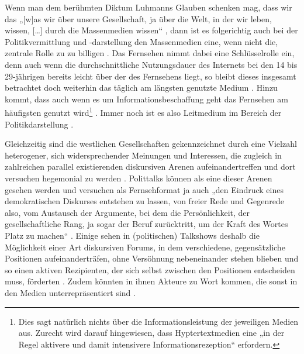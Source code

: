 Wenn man dem berühmten Diktum Luhmanns Glauben schenken mag, dass wir das „[w]as wir über unsere Gesellschaft, ja über die Welt, in der wir leben, wissen, [\ldots] durch die Massenmedien wissen“ \parencite[9]{luhmannRealitaetMassenmedien2017}, dann ist es folgerichtig auch bei der Politikvermittlung und -darstellung den Massenmedien eine, wenn nicht die, zentrale Rolle zu zu billigen \parencite[37-45]{doernerPolitainmentPolitikMedialen2001}. Das Fernsehen nimmt dabei eine Schlüsselrolle ein, denn auch wenn die durchschnittliche Nutzungsdauer des Internets bei den 14 bis 29-jährigen bereits leicht über der des Fernsehens liegt, so bleibt dieses insgesamt betrachtet doch weiterhin das täglich am längsten genutzte Medium \parencite{ard/zdf-medienkommissionARDZDFOnlinestudie2012}. Hinzu kommt, dass auch wenn es um Informationsbeschaffung geht das Fernsehen am häufigsten genutzt wird\footnote{Dies sagt natürlich nichts über die Informationsleistung der jeweiligen Medien aus. Zurecht wird darauf hingewiesen, dass Hyptertextmedien eine „in der Regel aktivere und damit intensivere Informationsrezeption“ \parencite[17]{mendeMedienuebergreifendeInformationsnutzungUnd2012} erfordern.} \parencite[16]{mendeMedienuebergreifendeInformationsnutzungUnd2012}. Immer noch ist es also Leitmedium im Bereich der Politikdarstellung \parencite[275]{bucherMedienrealitaetPolitischenZur2004}.

Gleichzeitig sind die westlichen Gesellschaften gekennzeichnet durch eine Vielzahl heterogener, sich widersprechender Meinungen und Interessen, die zugleich in zahlreichen parallel existierenden diskursiven Arenen aufeinandertreffen und dort versuchen hegemonial zu werden \parencite[306]{nonhoffHegemonieanalyseTheorieMethode2010}. Polittalks können als eine dieser Arenen gesehen werden und versuchen als Fernsehformat ja auch „den Eindruck eines demokratischen Diskurses entstehen zu lassen, von freier Rede und Gegenrede also, vom Austausch der Argumente, bei dem die Persönlichkeit, der gesellschaftliche Rang, ja sogar der Beruf zurücktritt, um der Kraft des Wortes Platz zu machen“ \parencite[32]{plakeTalkshowsIndustrialisierungKommunikation1999}. Einige sehen in (politischen) Talkshows deshalb die Möglichkeit einer Art diskursiven Forums, in dem verschiedene, gegensätzliche Positionen aufeinanderträfen, ohne Versöhnung nebeneinander stehen blieben und so einen aktiven Rezipienten, der sich selbst zwischen den Positionen entscheiden muss, förderten \parencite[18]{tolsonTalkingTalkAcademic2001}. Zudem könnten in ihnen Akteure zu Wort kommen, die sonst in den Medien unterrepräsentiert sind \parencite[386]{richardsonSpecificDebateFormats2008}.

